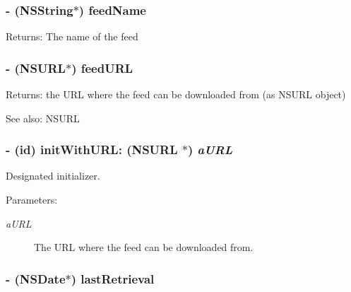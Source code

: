 \subsubsection{\setlength{\rightskip}{0pt plus 5cm}- (NSString$\ast$) feed\-Name }\label{classRSSFeed_b633045a0af241daedc5fc5c1aab72ea}


\begin{Desc}
\item[Returns:]The name of the feed \end{Desc}
\subsubsection{\setlength{\rightskip}{0pt plus 5cm}- (NSURL$\ast$) feed\-URL }\label{classRSSFeed_7faf1b2a0a0a5c4c6baad94f2e394834}


\begin{Desc}
\item[Returns:]the URL where the feed can be downloaded from (as NSURL object) \end{Desc}
\begin{Desc}
\item[See also:]NSURL \end{Desc}
\subsubsection{\setlength{\rightskip}{0pt plus 5cm}- (id) init\-With\-URL: (NSURL $\ast$) {\em a\-URL}}\label{classRSSFeed_c903aac5615dd840869a78c0f599ba4f}


Designated initializer.

\begin{Desc}
\item[Parameters:]
\begin{description}
\item[{\em a\-URL}]The URL where the feed can be downloaded from. \end{description}
\end{Desc}
\subsubsection{\setlength{\rightskip}{0pt plus 5cm}- (NSDate$\ast$) last\-Retrieval }\label{classRSSFeed_190fafaff71f21de561ba30be376d223}


